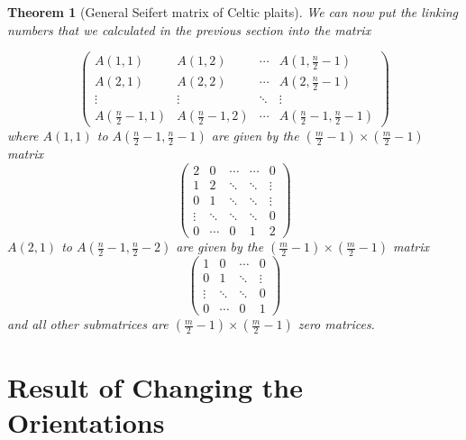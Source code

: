 \documentclass[10pt,a4paper]{report}
\newtheorem{theorem}{Theorem}[section]
\theoremstyle{definition}
\theoremstyle{remark}
\theoremstyle{example}
\begin{document}
\begin{theorem}[General Seifert matrix of Celtic plaits]
 We can now put the linking numbers that we calculated in the previous section into the matrix
 
\begin{equation*}
\left( \begin{array}{c|c|c|c}
A(1,1) & A(1,2) & \cdots & A(1,\frac{n}{2}-1) \\
\hline
A(2,1) & A(2,2) & \cdots & A(2,\frac{n}{2}-1) \\
\hline
\vdots & \vdots & \ddots & \vdots \\
\hline
A(\frac{n}{2}-1,1) & A(\frac{n}{2}-1,2) & \cdots & A(\frac{n}{2}-1,\frac{n}{2}-1)
\end{array} \right)
\end{equation*}
where $A(1,1)$ to $ A(\frac{n}{2}-1,\frac{n}{2}-1)$ are given by the $(\frac{m}{2}-1)\times (\frac{m}{2}-1)$ matrix
\begin{equation*}
\left( \begin{array}{ccccc}
2 & 0 & \cdots & \cdots & 0 \\
1 & 2 & \ddots & \ddots & \vdots \\
0 & 1 & \ddots & \ddots & \vdots \\
\vdots & \ddots & \ddots &  \ddots & 0 \\
0 & \cdots & 0 & 1 & 2
\end{array} \right)
\end{equation*}
$A(2,1)$ to $A(\frac{n}{2}-1,\frac{n}{2}-2)$ are given by the $(\frac{m}{2}-1)\times (\frac{m}{2}-1)$ matrix
\begin{equation*}
\left( \begin{array}{cccc}
1 & 0 & \cdots & 0 \\
0 & 1 & \ddots & \vdots \\
\vdots & \ddots & \ddots & 0 \\
0 & \cdots & 0 & 1
\end{array} \right)
\end{equation*}
and all other submatrices are $(\frac{m}{2}-1)\times (\frac{m}{2}-1)$ zero matrices.
\end{theorem}

 
\section{Result of Changing the Orientations}\label{orientations}
\end{document}
